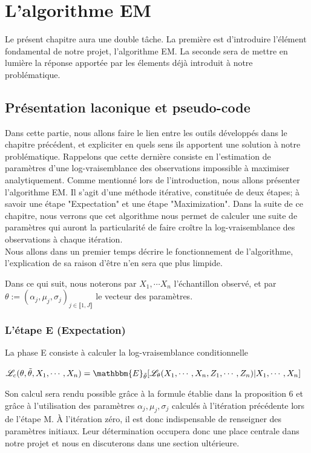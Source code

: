 \documentclass[frenchb]{report}
\newcommand{\1}{\mathbbm{1}}
\newcommand{\E}{\mathbbm{E}}
\newcommand{\lv}{\mathcal{L}}
\newcommand{\thetat}{\tilde{\theta}}
\theoremstyle{definition}\newtheorem{defn}{Définition}
\theoremstyle{definition}\newtheorem{exm}{Exemple}
\theoremstyle{definition}\newtheorem{nota}{Notation}
\theoremstyle{definition}\newtheorem{rem}{Remarque}
\begin{document}
\chapter{L'algorithme EM}

Le présent chapitre aura une double tâche. La première est d'introduire l'élément fondamental de notre projet, l'algorithme EM. La seconde sera de mettre en lumière la réponse apportée par les élements déjà introduit à notre problématique.

\section{Présentation laconique et pseudo-code}

Dans cette partie, nous allons faire le lien entre les outils développés dans le chapitre précédent, et expliciter en quels sens ils apportent une solution à notre problématique. Rappelons que cette dernière consiste en l'estimation de paramètres d'une log-vraisemblance des observations impossible à maximiser analytiquement. Comme mentionné lors de l'introduction, nous allons présenter l'algorithme EM. Il s'agit d'une méthode itérative, constituée de deux étapes; à savoir une étape "Expectation" et une étape "Maximization". Dans la suite de ce chapitre, nous verrons que cet algorithme nous permet de calculer une suite de paramètres qui auront la particularité de faire croître la log-vraisemblance des observations à chaque itération. \\
Nous allons dans un premier temps décrire le fonctionnement de l'algorithme, l'explication de sa raison d'être n'en sera que plus limpide.

Dans ce qui suit, nous noterons par $X_1,\cdots X_n$ l'échantillon observé, et par $\theta := (\alpha_j, \mu_j, \sigma_j)_{j\in\llbracket 1,J \rrbracket}$ le vecteur des paramètres.

\subsection{L'étape E (Expectation)}
La phase E consiste à calculer la log-vraisemblance conditionnelle 
\begin{center}
$\lv_{c}(\theta, \thetat, X_1, \cdots, X_n) = \E_{\thetat}[\lv_\theta(X_1, \cdots, X_n, Z_1, \cdots, Z_n) | X_1, \cdots, X_n]$
\end{center}
Son calcul sera rendu possible grâce à la formule établie dans la proposition 6 et grâce à l'utilisation des paramètres $\alpha_j, \mu_j, \sigma_j$ calculés à l'itération précédente lors de l'étape M. À l'itération zéro, il est donc indispensable de renseigner des paramètres initiaux. Leur détermination occupera donc une place centrale dans notre projet et nous en discuterons dans une section ultérieure.
\end{document}

